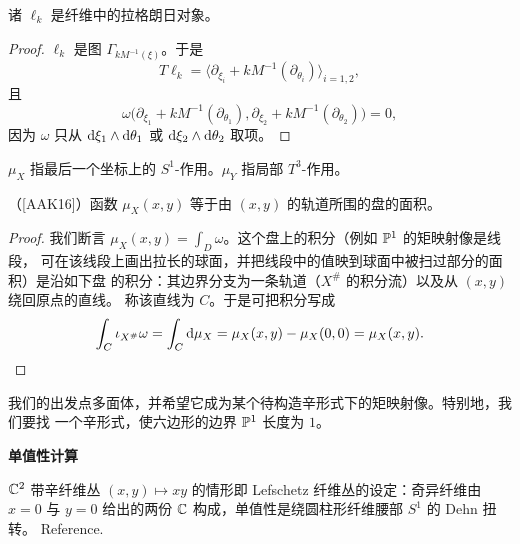 
\begin{corollary}\label{cor:4-1-17}
诸 $\ell_k$ 是纤维中的拉格朗日对象。
\end{corollary}

\begin{proof}
$\ell_k$ 是图 $\Gamma_{kM^{-1}(\xi)}$。于是
\[
T\ell_k=\big\langle\partial_{\xi_i}+kM^{-1}(\partial_{\theta_i})\big\rangle_{i=1,2},
\]
且
\[
\omega\big(\partial_{\xi_1}+kM^{-1}(\partial_{\theta_1}),
\partial_{\xi_2}+kM^{-1}(\partial_{\theta_2})\big)=0,
\]
因为 $\omega$ 只从 $\mathrm{d}\xi_1\wedge\mathrm{d}\theta_1$ 或 $\mathrm{d}\xi_2\wedge\mathrm{d}\theta_2$ 取项。
\end{proof}


\begin{remark}[记号]\label{rem:4-1-18}
$\mu_X$ 指最后一个坐标上的 $S^1$-作用。$\mu_Y$ 指局部 $T^3$-作用。
\end{remark}

\begin{claim}\label{clm:4-1-19}
（[AAK16]）函数 $\mu_X(x,y)$ 等于由 $(x,y)$ 的轨道所围的盘的面积。
\end{claim}

\begin{proof}
我们断言 $\mu_X(x,y)=\int_D\omega$。这个盘上的积分（例如 $\mathbb{P}^1$ 的矩映射像是线段，
可在该线段上画出拉长的球面，并把线段中的值映到球面中被扫过部分的面积）是沿如下盘
的积分：其边界分支为一条轨道（$X^{\#}$ 的积分流）以及从 $(x,y)$ 绕回原点的直线。
称该直线为 $C$。于是可把积分写成
\[
\int_C\iota_{X^{\#}}\omega=\int_C\mathrm{d}\mu_X=\mu_X(x,y)-\mu_X(0,0)=\mu_X(x,y).
\]
\end{proof}


\begin{remark}\label{rem:4-1-20}
我们的出发点多面体，并希望它成为某个待构造辛形式下的矩映射像。特别地，我们要找
一个辛形式，使六边形的边界 $\mathbb{P}^1$ 长度为 $1$。
\end{remark}

\medskip\noindent\textbf{单值性计算}\par
\begin{example}\label{ex:4-1-21}
$\mathbb{C}^2$ 带辛纤维丛 $(x,y)\mapsto xy$ 的情形即 Lefschetz 纤维丛的设定：奇异纤维由
$x=0$ 与 $y=0$ 给出的两份 $\mathbb{C}$ 构成，单值性是绕圆柱形纤维腰部 $S^1$ 的 Dehn 扭转。
Reference.
\end{example}


